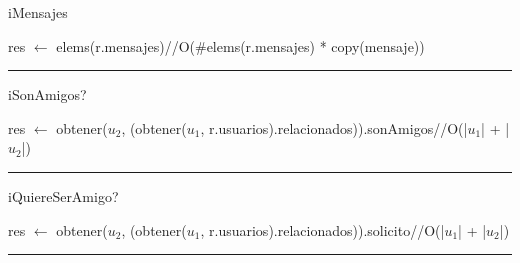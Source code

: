 \begin{algorithm}[H]
\caption{iMensajes}
\begin{algorithmic}[1]
\state res $\gets$ elems(r.mensajes)\hfill//O(\#elems(r.mensajes) * copy(mensaje))
\EndFunction 
\end{algorithmic}
\hrule
{}
\end{algorithm}

\begin{algorithm}[H]
\caption{iSonAmigos?}
\begin{algorithmic}[1]
\state res $\gets$ obtener($u_2$, (obtener($u_1$, r.usuarios).relacionados)).sonAmigos\hfill//O(|$u_1$| + |$u_2$|)
\EndFunction 
\end{algorithmic}
\hrule
{}
\end{algorithm}

\begin{algorithm}[H]
\caption{iQuiereSerAmigo?}
\begin{algorithmic}[1]
\state res $\gets$ obtener($u_2$, (obtener($u_1$, r.usuarios).relacionados)).solicito\hfill//O(|$u_1$| + |$u_2$|)
\EndFunction 
\end{algorithmic}
\hrule
{}
\end{algorithm}

